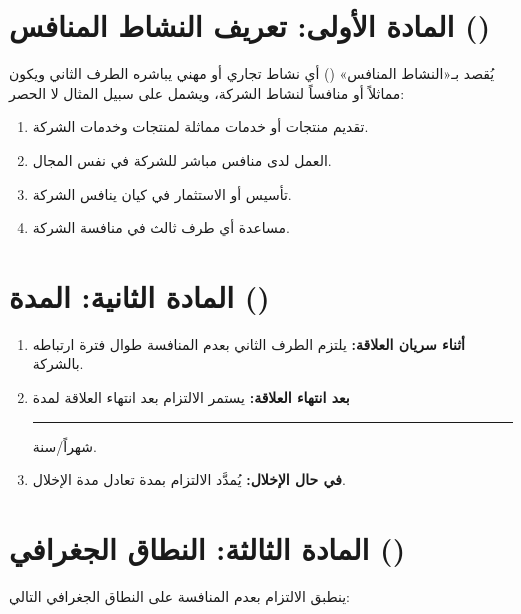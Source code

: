 \documentclass[12pt,a4paper]{article}
\begin{document}
\vspace{1em}

\section{المادة الأولى: تعريف النشاط المنافس ()}
\label{sec:definition}
يُقصد بـ«النشاط المنافس» () أي نشاط تجاري أو مهني يباشره الطرف الثاني ويكون مماثلاً أو منافساً لنشاط الشركة، ويشمل على سبيل المثال لا الحصر:
\begin{enumerate}
    \item تقديم منتجات أو خدمات مماثلة لمنتجات وخدمات الشركة.
    \item العمل لدى منافس مباشر للشركة في نفس المجال.
    \item تأسيس أو الاستثمار في كيان ينافس الشركة.
    \item مساعدة أي طرف ثالث في منافسة الشركة.
\end{enumerate}

\section{المادة الثانية: المدة ()}
\label{sec:duration}
\begin{enumerate}
    \item \textbf{أثناء سريان العلاقة:} يلتزم الطرف الثاني بعدم المنافسة طوال فترة ارتباطه بالشركة.
    \item \textbf{بعد انتهاء العلاقة:} يستمر الالتزام بعد انتهاء العلاقة لمدة \rule{2cm}{0.4pt} شهراً/سنة.
    \item \textbf{في حال الإخلال:} يُمدَّد الالتزام بمدة تعادل مدة الإخلال.
\end{enumerate}

\section{المادة الثالثة: النطاق الجغرافي ()}
\label{sec:territory}
ينطبق الالتزام بعدم المنافسة على النطاق الجغرافي التالي:
\end{document}
